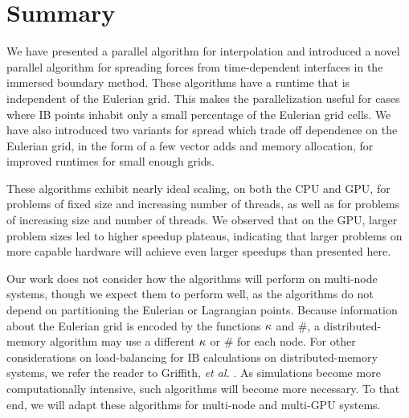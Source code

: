 \section{Summary} \label{sec:summary}

We have presented a parallel algorithm for interpolation and introduced a novel parallel
algorithm for spreading forces from time-dependent interfaces in the immersed boundary
method. These algorithms have a runtime that is independent of the Eulerian grid. This
makes the parallelization useful for cases where IB points inhabit only a small
percentage of the Eulerian grid cells. We have also introduced two variants for spread
which trade off dependence on the Eulerian grid, in the form of a few vector adds and
memory allocation, for improved runtimes for small enough grids.

These algorithms exhibit nearly ideal scaling, on both the CPU and GPU, for problems of
fixed size and increasing number of threads, as well as for problems of increasing size
and number of threads.  We observed that on the GPU, larger problem sizes led to higher
speedup plateaus, indicating that larger problems on more capable hardware will achieve
even larger speedups than presented here.

Our work does not consider how the algorithms will perform on multi-node systems, though
we expect them to perform well, as the algorithms do not depend on partitioning the
Eulerian or Lagrangian points. Because information about the Eulerian grid is encoded by
the functions $\kappa$ and $\#$, a distributed-memory algorithm may use a different $\kappa$
or $\#$ for each node. For other considerations on load-balancing for IB calculations on
distributed-memory systems, we refer the reader to Griffith, \textit{et al.}
\cite{Griffith:2007uk}. As simulations become more computationally intensive, such
algorithms will become more necessary. To that end, we will adapt these algorithms for
multi-node and multi-GPU systems.

